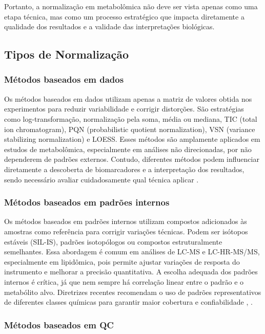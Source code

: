 Portanto, a normalização em metabolômica não deve ser vista apenas como uma etapa técnica, mas como um processo estratégico que impacta diretamente a qualidade dos resultados e a validade das interpretações biológicas.

\subsection{Tipos de Normalização}

\subsubsection{Métodos baseados em dados}

Os métodos baseados em dados utilizam apenas a matriz de valores obtida nos experimentos para reduzir variabilidade e corrigir distorções. São estratégias como log-transformação, normalização pela soma, média ou mediana, TIC (total ion chromatogram), PQN (probabilistic quotient normalization), VSN (variance stabilizing normalization) e LOESS. Esses métodos são amplamente aplicados em estudos de metabolômica, especialmente em análises não direcionadas, por não dependerem de padrões externos. Contudo, diferentes métodos podem influenciar diretamente a descoberta de biomarcadores e a interpretação dos resultados, sendo necessário avaliar cuidadosamente qual técnica aplicar \cite{datanor,li2016performance}.

\subsubsection{Métodos baseados em padrões internos}

Os métodos baseados em padrões internos utilizam compostos adicionados às amostras como referência para corrigir variações técnicas. Podem ser isótopos estáveis (SIL-IS), padrões isotopólogos ou compostos estruturalmente semelhantes. Essa abordagem é comum em análises de LC-MS e LC-HR-MS/MS, especialmente em lipidômica, pois permite ajustar variações de resposta do instrumento e melhorar a precisão quantitativa. A escolha adequada dos padrões internos é crítica, já que nem sempre há correlação linear entre o padrão e o metabólito alvo. Diretrizes recentes recomendam o uso de padrões representativos de diferentes classes químicas para garantir maior cobertura e confiabilidade \cite{drotleff2019guidelines}, \cite{datanor}.

\subsubsection{Métodos baseados em QC}

